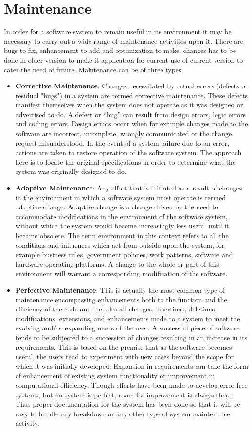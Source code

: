 \section{Maintenance}
In order for a software system to remain useful in its environment it 
may be necessary to carry out a wide range of maintenance activities 
upon it. There are bugs to fix, enhancement to add and optimization to 
make, changes has to be done in older version to make it application 
for current use of current version to cater the need of future. 
Maintenance can be of three types:\\
\begin{itemize}
\item {\bf{Corrective Maintenance}}: Changes necessitated by actual errors 
(defects or residual "bugs") in a system are termed corrective 
maintenance. These defects manifest themselves when the system does not
operate as it was designed or advertised to do. A defect or “bug” can 
result from design errors, logic errors and coding errors. Design errors 
occur when for example changes made to the software are incorrect, 
incomplete, wrongly communicated or the change request misunderstood. 
In the event of a system failure due to an error, actions are taken to 
restore operation of the software system. The approach here is to locate 
the original specifications in order to determine what the system was 
originally designed to do.
\item {\bf{Adaptive Maintenance}}: Any effort that is initiated as a result of 
changes in the environment in which a software system must operate is 
termed adaptive change. Adaptive change is a change driven by the need
to accommodate modifications in the environment of the software system, 
without which the system would become increasingly less useful until it 
became obsolete. The term environment in this context refers to all the 
conditions and influences which act from outside upon the system, for 
example business rules, government policies, work patterns, software 
and hardware operating platforms. A change to the whole or part of this 
environment will warrant a corresponding modification of the software.
\item {\bf{Perfective Maintenance}}: This is actually the most common type of 
maintenance encompassing enhancements both to the function and the 
efficiency of the code and includes all changes, insertions, deletions, 
modifications, extensions, and enhancements made to a system to meet 
the evolving and/or expanding needs of the user. A successful piece of 
software tends to be subjected to a succession of changes resulting in 
an increase in its requirements. This is based on the premise that as 
the software becomes useful, the users tend to experiment with new 
cases beyond the scope for which it was initially developed. Expansion 
in requirements can take the form of enhancement of existing system 
functionality or improvement in computational efficiency. Though 
efforts have been made to develop error free systems, but no system is 
perfect, room for improvement is always there. Thus proper documentation 
for the system has been done so that it will be easy to handle any 
breakdown or any other type of system maintenance activity.

\end{itemize}
\newpage


